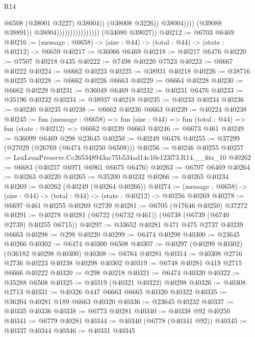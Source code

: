 \begin{lexlean}{R14}
\begin{coremodule}
                                                      @6508
                                                      (@38001 @3227)
                                                      @38004))
                                                  (@38008 @3226))
                                                @38004))))
                                        (@39088 @38891))
                                      @38004))))))))))))))))
      (@34080 @39027))
@40212 := @6703 @6469
@40216 := (message : @6658) -> (size : @44) -> (total : @44) -> (state : @40212) -> @6659
@40217 := @36066 @6469
@40218 := @40217 @6476
@40220 := @7507 @40218 @435
@40222 := @7498 @40220 @7523
@40223 := @6667 @40222
@40224 := @6662 @40223
@40225 := @38931 @40218
@40226 := @38716 @40225
@40228 := @6662 @40226 @6663
@40229 := @6664 @40228
@40230 := @6662 @40229
@40231 := @36049 @6469
@40232 := @40231 @6476
@40233 := @35196 @40232
@40234 := @38937 @40218
@40235 := @40233 @40234
@40236 := @40230 @40235
@40238 := @6662 @40236 @6663
@40239 := @40224 @40238
@40245 := fun (message : @6658) =>
  fun (size : @44) => fun (total : @44) => fun (state : @40212) => @6662 @40239 @6663
@40246 := @6673 @461
@40249 := @36099 @6469 @298 @23645
@40250 := @40249 @6476
@40255 := @37299 (@27029 (@26769 (@6474 @40250 @6508)))
@40256 := @40246 @40255
@40257 := LexLeanPreserve.Cc265348943ac75b534ad14c10e123f73.R14.__fits_10
@40262 := @6683 (@40257 @6971 @6961 @6675 @6476)
@40263 := @6707 @6469
@40264 := @40263 @40220
@40265 := @35200 @40232
@40266 := @40265 @40234
@40269 := @40262 (@40249 (@40264 @40266))
@40274 := (message : @6658) -> (size : @44) -> (total : @44) -> (state : @40212) -> @40256 @40269
@40278 := @6697 @461 @40255 @40269 @2739
@40281 := @6705 (@17646 @40250) @37272
@40291 := @40278 @40281 (@6722 (@6732 @461)) (@6738 (@6739 (@6740 @2739) @40255 @6715))
@40297 := @33652 @40281 @471 @475 @2737 @40239 @6663
@40298 := @298 @40220
@40299 := @6474 @40298
@40300 := @23645 @40266
@40302 := @6474 @40300 @6508
@40307 := @40297 (@40299 @40302) (@36182 @40298 @40300)
@40308 := @6764 @40281
@40314 := @40308 @2716 @2736 @40223 @40238 @40298 @40302
@40319 := @6748 @40281 @419 @2715 @6666 @40222
@40320 := @298 @40218
@40321 := @6474 @40320
@40322 := @35288 @6508
@40325 := @40319 (@40321 @40322) @40298
@40326 := @40308 @2713
@40331 := @40326 @447 @6663 @6665 @40320 @40322
@40335 := @36204 @40281 @189 @6663 @40320
@40336 := @23645 @40232
@40337 := @40335 @40336
@40338 := @6773 @40281
@40340 := @40338 @92 @40250
@40341 := @6779 @40281
@40344 := @40340 (@6778 (@40341 @92))
@40345 := @40337 @40344
@40346 := @40331 @40345

\end{coremodule}
\end{lexlean}
